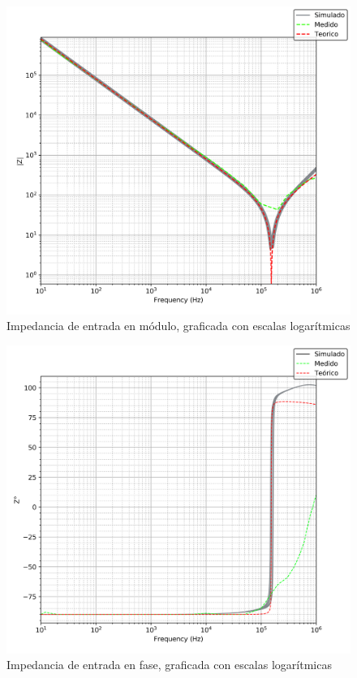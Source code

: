 \begin{figure}[H]
	\centering
	\includegraphics[scale=0.7]{../EJ4/Recursos/Derivador/impedancia_modulo.png}
	\caption{Impedancia de entrada en m\'odulo, graficada con escalas logar\'itmicas}
	\label{fig:derivador_impedancia_modulo}
\end{figure}

\begin{figure}[H]
	\centering
	\includegraphics[scale=0.7]{../EJ4/Recursos/Derivador/impedancia_fase.png}
	\caption{Impedancia de entrada en fase, graficada con escalas logar\'itmicas}
	\label{fig:derivador_impedancia_fase}
\end{figure}


